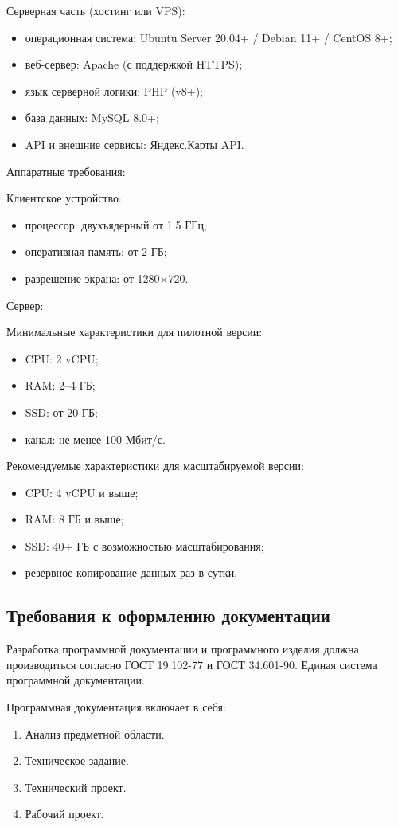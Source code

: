 Серверная часть (хостинг или VPS):
\begin{itemize}
	\item операционная система: Ubuntu Server 20.04+ / Debian 11+ / CentOS 8+;
	\item веб-сервер: Apache (с поддержкой HTTPS);
	\item язык серверной логики: PHP (v8+);
	\item база данных: MySQL 8.0+;
	\item API и внешние сервисы: Яндекс.Карты API\cite{b11}.
\end{itemize}

Аппаратные требования:

Клиентское устройство:
\begin{itemize}
	\item процессор: двухъядерный от 1.5 ГГц;
	\item оперативная память: от 2 ГБ;
	\item разрешение экрана: от 1280×720.
\end{itemize}

Сервер:

Минимальные характеристики для пилотной версии:
\begin{itemize}
	\item CPU: 2 vCPU;
	\item RAM: 2–4 ГБ;
	\item SSD: от 20 ГБ;
	\item канал: не менее 100 Мбит/с.
\end{itemize}

Рекомендуемые характеристики для масштабируемой версии:
\begin{itemize}
	\item CPU: 4 vCPU и выше;
	\item RAM: 8 ГБ и выше;
	\item SSD: 40+ ГБ с возможностью масштабирования;
	\item резервное копирование данных раз в сутки.
\end{itemize}

\subsection{Требования к оформлению документации}

Разработка программной документации и программного изделия должна производиться согласно ГОСТ 19.102-77 и ГОСТ 34.601-90. Единая система программной документации.

Программная документация включает в себя:
\begin{enumerate}
	\item Анализ предметной области.
	\item Техническое задание.
	\item Технический проект.
	\item Рабочий проект.
\end{enumerate}
